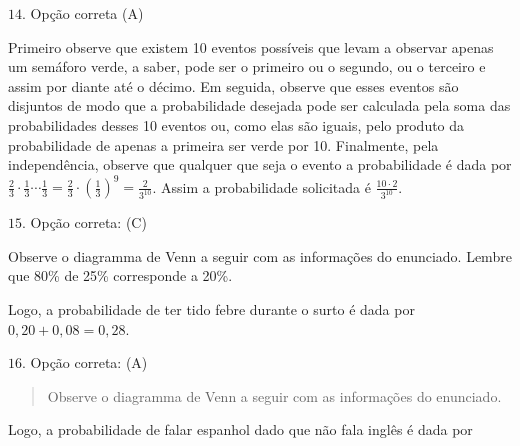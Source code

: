 \(14.\) Opção correta (A)

Primeiro observe que existem 10 eventos possíveis que levam a observar apenas um semáforo verde, a saber, pode ser o primeiro ou o segundo, ou o terceiro e assim por diante até o décimo. Em seguida, observe que esses eventos são disjuntos de modo que a probabilidade desejada pode ser calculada pela soma das probabilidades desses 10 eventos ou, como elas são iguais, pelo produto da probabilidade de apenas a primeira ser verde por 10. Finalmente, pela independência, observe que qualquer que seja o evento a probabilidade é dada por \(\frac{2}{3}\cdot \frac{1}{3} \cdots \frac{1}{3}=\frac{2}{3}\cdot \left (\frac{1}{3}\right )^9=\frac{2}{3^{10}}\). Assim a probabilidade solicitada é \(\frac{10\cdot 2}{3^{10}}\).

\(15.\) Opção correta: (C)

Observe o diagramma de Venn a seguir com as informações do enunciado. Lembre que 80\% de 25\% corresponde a 20\%.
\begin{center}\end{center}
Logo, a probabilidade de ter tido febre durante o surto é dada por \(0,20+0,08=0,28\).

\(16.\) Opção correta: (A)
\begin{quote}

Observe o diagramma de Venn a seguir com as informações do enunciado.
\end{quote}
\begin{center}\end{center}
Logo, a probabilidade de falar espanhol dado que não fala inglês é dada por


